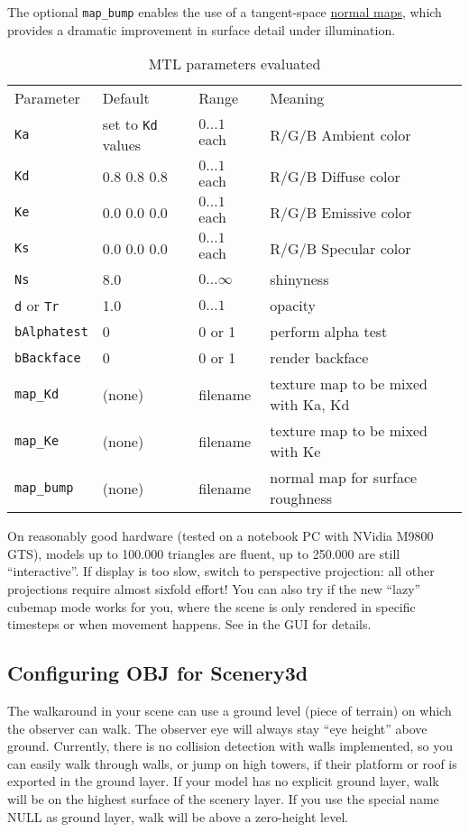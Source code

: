 \documentclass[a4paper]{article}
\newcommand{\cmd}[1]{\texttt{#1}}
\begin{document}
The optional \cmd{map\_bump} enables the use of a tangent-space \href{https://en.wikipedia.org/wiki/Normal_mapping}{normal maps}, which provides a dramatic improvement in surface detail under illumination.

\begin{table}
\begin{tabular}{llll}
Parameter&Default      &Range     & Meaning\\
\cmd{Ka}       &set to \cmd{Kd} values & $0\dots1$ each& R/G/B Ambient color\\
\cmd{Kd}      &0.8 0.8 0.8  & $0\dots1$ each& R/G/B Diffuse color\\
\cmd{Ke}      &0.0 0.0 0.0  & $0\dots1$ each& R/G/B Emissive color\\
\cmd{Ks}      &0.0 0.0 0.0  & $0\dots1$ each& R/G/B Specular color\\
\cmd{Ns}       &8.0          & $0\dots\infty$  & shinyness \\
\cmd{d} or \cmd{Tr}  &1.0          & $0\dots1$     & opacity \\
\cmd{bAlphatest}&0           & 0 or 1   & perform alpha test \\
\cmd{bBackface}&0            & 0 or 1   & render backface \\
\cmd{map\_Kd}  & (none)      & filename & texture map to be mixed with Ka, Kd \\
\cmd{map\_Ke}  & (none)      & filename & texture map to be mixed with Ke \\
\cmd{map\_bump}& (none)      & filename & normal map for surface roughness  
\end{tabular}
\caption{MTL parameters evaluated}
\label{tab:MTL}
\end{table}

On reasonably good hardware (tested on a notebook PC with NVidia M9800
GTS), models up to 100.000 triangles are fluent, up to 250.000 are
still ``interactive''.  If display is too slow, switch to perspective
projection: all other projections require almost sixfold effort!
You can also try if the new ``lazy'' cubemap mode works for you, where
the scene is only rendered in specific timesteps or when movement happens.
See in the GUI for details.


\subsection{Configuring OBJ for Scenery3d}
\label{sec:Configuring}

The walkaround in your scene can use a ground level (piece of terrain)
on which the observer can walk. The observer eye will always stay ``eye
height'' above ground. Currently, there is no collision detection with
walls implemented, so you can easily walk through walls, or jump on
high towers, if their platform or roof is exported in the ground
layer. If your model has no explicit ground layer, walk will be on the
highest surface of the scenery layer.  If you use the special name
NULL as ground layer, walk will be above a zero-height level.
\end{document}

